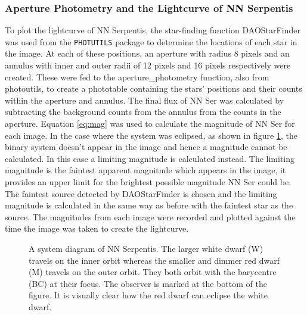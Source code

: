 \documentclass[%
reprint,
amsmath,amssymb,
aps,
]{revtex4-2}
\begin{document}
			\subsubsection{Aperture Photometry and the Lightcurve of NN Serpentis}
				To plot the lightcurve of NN Serpentis, the star-finding function DAOStarFinder was used from the \texttt{PHOTUTILS} package to determine the locations of each star in the image. At each of these positions, an aperture with radius 8 pixels and an annulus with inner and outer radii of 12 pixels and 16 pixels respectively were created. These were fed to the aperture\_photometry function, also from photoutils, to create a phototable containing the stars' positions and their counts within the aperture and annulus. The final flux of NN Ser was calculated by subtracting the background counts from the annulus from the counts in the aperture. Equation \ref{eq:mag} was used to calculate the magnitude of NN Ser for each image. In the case where the system was eclipsed, as shown in figure \ref{fig:diagram}, the binary system doesn't appear in the image and hence a magnitude cannot be calculated. In this case a limiting magnitude is calculated instead. The limiting magnitude is the faintest apparent magnitude which appears in the image\cite{manual}, it provides an upper limit for the brightest possible magnitude NN Ser could be. The faintest source detected by DAOStarFinder is chosen and the limiting magnitude is calculated in the same way as before with the faintest star as the source. The magnitudes from each image were recorded and plotted against the time the image was taken to create the lightcurve.
								
				\begin{figure}
					\caption{\label{fig:diagram}A system diagram of NN Serpentis. The larger white dwarf (W) travels on the inner orbit whereas the smaller and dimmer red dwarf (M) travels on the outer orbit. They both orbit with the barycentre (BC) at their focus. The observer is marked at the bottom of the figure. It is visually clear how the red dwarf can eclipse the white dwarf.}
				\end{figure}	
		
\end{document}
